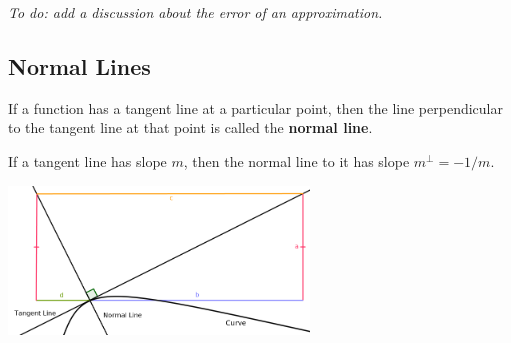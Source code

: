 \begin{ex}
\end{ex}

\emph{To do: add a discussion about the error of an approximation.}

\subsection*{Normal Lines}
If a function has a tangent line at a particular point, then the line perpendicular to the tangent line
at that point is called the \textbf{normal line}.

\begin{thm}
  If a tangent line has slope $ m $, then the normal line to it has slope $ m^\perp = -1/m $.
\end{thm}

\begin{center}
  \includegraphics[width=0.6\textwidth]{normal-line-proof}
\end{center}

